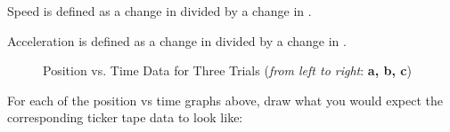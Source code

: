 \begin{questions}
\qspppp
\newpage
\begin{spacing}{1.5}
\question[1] Speed is defined as a change in \underline{\hspace{5cm}} divided by a change in \underline{\hspace{5cm}}. 

\qsp

\question[1] Acceleration is defined as a change in \underline{\hspace{5cm}} divided by a change in \underline{\hspace{5cm}}. 
\end{spacing}
\qspp

\begin{figure}[H]
    \centering
    \caption{Position vs. Time Data for Three Trials (\emph{from left to right}: \textbf{a, b, c})}
\end{figure}

\question[2] For each of the position vs time graphs above, draw what you would expect the corresponding ticker tape data to look like:
\begin{parts}
\part 

\begin{tcolorbox}[colframe=black,colback=white,boxrule=1pt,width=0.9\textwidth,height=15mm]
\end{tcolorbox}

\qsp

\part 

\begin{tcolorbox}[colframe=black,colback=white,boxrule=1pt,width=0.9\textwidth,height=15mm]
\end{tcolorbox}

\qsp


\end{parts}
\end{questions}
